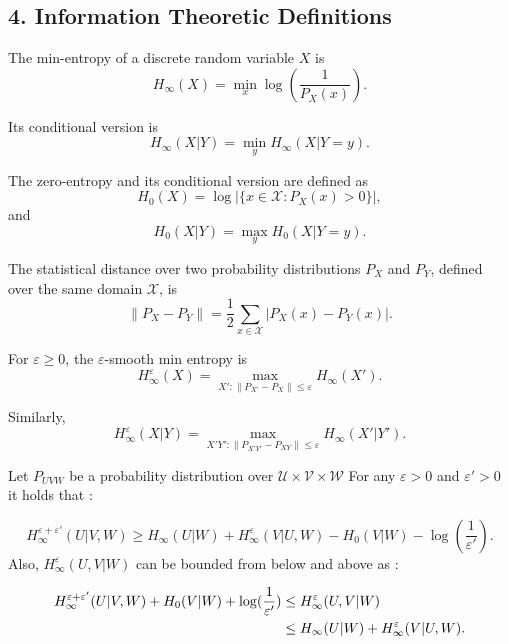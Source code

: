 \documentclass[runningheads]{llncs}
\newcommand{\parbreak}{ \vspace{0.3 em}}
\begin{document}
\subsection*{4. Information Theoretic Definitions}

The min-entropy of a discrete random variable $X $ is 
\[
H_\infty(X) = \min_x \log \left( \frac{1}{P_X(x)} \right).
\]

Its conditional version is 
\[
H_\infty(X|Y) = \min_y H_\infty(X|Y=y).
\]

The zero-entropy and its conditional version are defined as 
\[
H_0(X) = \log |\{ x \in \mathcal{X} : P_X(x) > 0 \}|,
\]
and 
\[
H_0(X|Y) = \max_y H_0(X|Y=y).
\]

The statistical distance over two probability distributions $P_X $ and $P_Y $, defined over the same domain $\mathcal{X} $, is 
\[
\| P_X - P_Y \| = \frac{1}{2} \sum_{x \in \mathcal{X}} |P_X(x) - P_Y(x)|.
\]

For $\varepsilon \geq 0 $, the $\varepsilon $-smooth min entropy is 
\[
H_\infty^\varepsilon(X) = \max_{X' : \| P_{X'} - P_X \| \leq \varepsilon} H_\infty(X').
\]

Similarly,
\[
H_\infty^\varepsilon(X|Y) = \max_{X'Y' : \| P_{X'Y'} - P_{XY} \| \leq \varepsilon} H_\infty(X'|Y').
\]


Let $P_{UVW}$ be a probability distribution over $\mathcal{U}\times\mathcal{V}\times\mathcal{W}$ For any $\varepsilon > 0 $ and $\varepsilon' > 0$ it holds that \cite{Holenstein}: 

\begin{equation}\label{eq: holenstein-1}
    H_\infty^{\varepsilon+\varepsilon'}(U|V,W) \geq H_\infty(U|W) + H_\infty^\varepsilon(V|U,W) - H_0(V|W) - \log(\frac{1}{\varepsilon'}).
\end{equation}
\parbreak Also, $H^{\varepsilon}_{\infty}(U,V|W)$ can be bounded from below and above as \cite{Holenstein}: 

\begin{align}\label{eq: holenstein-2}
    H_\infty^{\varepsilon+\varepsilon'}(U|V,W) + H_{0}(V|W) + \log(\frac{1}{\varepsilon'})&\leq H^{\varepsilon}_{\infty}(U,V|W)\notag\\
    & \leq H_{\infty}(U|W) + H^{\varepsilon}_{\infty}(V|U,W).
\end{align}
\end{document}
